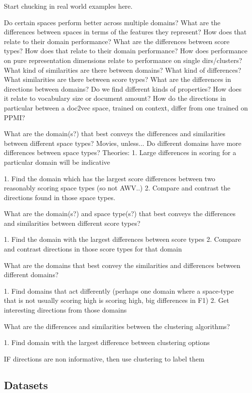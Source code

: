 Start chucking in real world examples here.

Do certain spaces perform better across multiple domains?
What are the differences between spaces in terms of the features they represent? How does that relate to their domain performance?
What are the differences between score types? How does that relate to their domain performance?
How does performance on pure representation dimensions relate to performance on single dirs/clusters?
What kind of similarities are there between domains? What kind of differences?
What similarities are there between score types?
What are the differences in directions between domains? Do we find different kinds of properties? How does it relate to vocabulary size or document amount?
How do the directions in particular between a doc2vec space, trained on context, differ from one trained on PPMI?


What are the domain(s?) that best conveys the differences and similarities between different space types?
	Movies, unless...
		Do different domains have more differences between space types? Theories:
			1. Large differences in scoring for a particular domain will be indicative
			
1. Find the domain which has the largest score differences between two reasonably scoring space types (so not AWV..)
2. Compare and contrast the directions found in those space types. 

What are the domain(s?) and space type(s?) that best conveys the differences and similarities between different score types?

1. Find the domain with the largest differences between score types
2. Compare and contrast directions in those score types for that domain

What are the domains that best convey the similarities and differences between different domains?

1. Find domains that act differently (perhaps one domain where a space-type that is not usually scoring high is scoring high, big differences in F1)
2. Get interesting directions from those domains

What are the differences and similarities between the clustering algorithms?

1. Find domain with the largest difference between clustering options

IF directions are non informative, then use clustering to label them


\subsection{Datasets}

